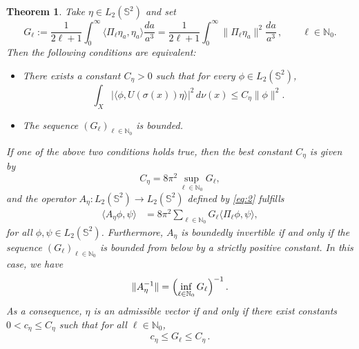 \documentclass[a4paper,11pt,DIV=11,%
abstract=on%
]{scrartcl}
\newtheorem{thm}{Theorem}[section]
\def\N{{\mathbb N}}
\newcommand{\red}[1]{#1}
\newcommand{\blue}[1]{#1}
\begin{document}
\begin{thm}\label{prop-admissible-upper-er}
	\red{Take $\eta\in L_2(\mathbb S^2)$  and set}
	\begin{equation}\label{G_ell}
		G_{\ell}:=
		\frac{1}{2\ell+1}\int_0^\infty
		\langle \Pi_{\ell}\eta_a , \eta_a \rangle \frac{da}{a^3} 
		= \frac{1}{2\ell+1}\int_0^\infty
		\| \Pi_{\ell}\eta_a \|^2 \frac{da}{a^3}\,,
		\qquad\ell\in\N_0.
	\end{equation}
\red{Then} the following conditions are equivalent: 
	\begin{itemize}
		\item[i)]
		There exists a constant $C_\eta>0$ such that for every $\phi\in L_2(\mathbb S^2)$,
		\begin{equation}\label{eq:1}
			\int_X\bigl|\bigl\langle\phi,U(\sigma(x))\eta\bigr\rangle\bigr|^2\,d\nu(x)
			\leq C_\eta\|\phi\|^2.
		\end{equation}
			\item[ii)]
		The sequence $(G_\ell)_{\ell\in\N_0}$ is bounded.
	\end{itemize}
	If one of the above two conditions holds true, then the best constant $C_\eta$ is given by
		$$C_\eta=8\pi^2\sup_{\ell\in\N_0}G_\ell,$$
and the operator $A_\eta: L_2(\mathbb S^2)\to L_2(\mathbb S^2)$ defined by \eqref{eq:2} fulfills
		\begin{align}
			\langle A_\eta\phi,\psi\rangle
			&=\red{8\pi^2} \sum_{\ell\in\N_0} G_\ell \langle \Pi_\ell \phi,\psi\rangle, \label{eq:3}
		\end{align}
		for all $\phi,\psi\in L_2(\mathbb
                S^2)$. \red{Furthermore, $A_\eta$ is boundedly invertible if and only if the
	sequence $(G_\ell)_{\ell\in \N_0}$ is bounded from below by a
        strictly positive constant.  
In this case, we  have
	$$\|A_\eta^{-1}\|=\Bigl(\inf_{\ell\in\N_0}G_\ell\Bigr)^{-1}\,.$$
 \blue{As a consequence}, $\eta$ is an admissible vector if and only if there exist
constants $0<c_\eta\leq C_\eta$ such that for all $\ell\in\N_0$,
\[ c_\eta\leq G_\ell\leq C_\eta\, .\]
}                  
\end{thm}
\end{document}
